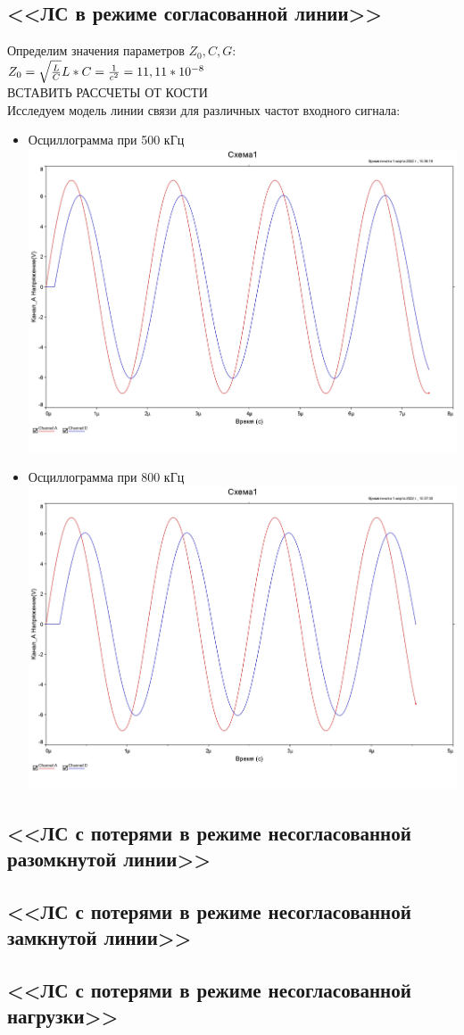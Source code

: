 \documentclass[11pt]{article}
\begin{document}
\subsection{<<ЛС в режиме согласованной линии>>}
Определим значения параметров $Z_0, C, G$:\\
$Z_0 = \sqrt{\frac{L}{C}}\\
L*C = \frac{1}{c^2} = 11,11*10^{-8}$\\
ВСТАВИТЬ РАССЧЕТЫ ОТ КОСТИ\\
Исследуем модель линии связи для различных частот входного сигнала:
\begin{itemize}
    \item Осциллограмма при 500 кГц\\
        \includegraphics[width=1\linewidth]{1/500kgzosc.jpg}
    \item Осциллограмма при 800 кГц\\
        \includegraphics[width=1\linewidth]{1/800kgzosc.jpg}
\end{itemize}



\subsection{<<ЛС с потерями в режиме несогласованной разомкнутой линии>>}
\subsection{<<ЛС с потерями в режиме несогласованной замкнутой линии>>}
\subsection{<<ЛС с потерями в режиме несогласованной нагрузки>>}
\end{document}
